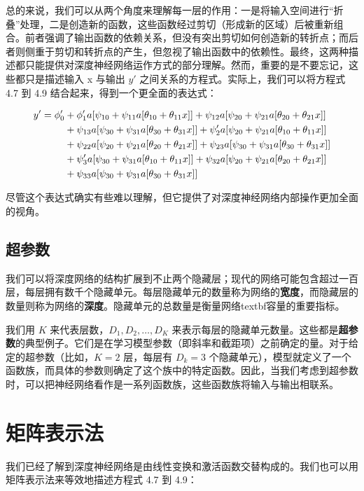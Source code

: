 总的来说，我们可以从两个角度来理解每一层的作用：一是将输入空间进行“折叠”处理，二是创造新的函数，这些函数经过剪切（形成新的区域）后被重新组合。前者强调了输出函数的依赖关系，但没有突出剪切如何创造新的转折点；而后者则侧重于剪切和转折点的产生，但忽视了输出函数中的依赖性。最终，这两种描述都只能提供对深度神经网络运作方式的部分理解。然而，重要的是不要忘记，这些都只是描述输入 x 与输出 \(y \prime\) 之间关系的方程式。实际上，我们可以将方程式 4.7 到 4.9 结合起来，得到一个更全面的表达式：



\begin{align}
	y' = \phi'_0 &+ \phi'_1 a[\psi_{10} + \psi_{11} a[\theta_{10} + \theta_{11} x]] + \psi_{12} a[\psi_{20} + \psi_{21} a[\theta_{20} + \theta_{21} x]] \notag \\
	&+ \psi_{13} a[\psi_{30} + \psi_{31} a[\theta_{30} + \theta_{31} x]] + \psi'_{2} a[\psi_{20} + \psi_{21} a[\theta_{10} + \theta_{11} x]] \notag \\
	&+ \psi_{22} a[\psi_{20} + \psi_{21} a[\theta_{20} + \theta_{21} x]] + \psi_{23} a[\psi_{30} + \psi_{31} a[\theta_{30} + \theta_{31} x]] \notag \\
	&+ \psi'_{3} a[\psi_{30} + \psi_{31} a[\theta_{10} + \theta_{11} x]] + \psi_{32} a[\psi_{20} + \psi_{21} a[\theta_{20} + \theta_{21} x]] \notag \\
	&+ \psi_{33} a[\psi_{30} + \psi_{31} a[\theta_{30} + \theta_{31} x]] 
\end{align} 


尽管这个表达式确实有些难以理解，但它提供了对深度神经网络内部操作更加全面的视角。

\subsection{超参数}
我们可以将深度网络的结构扩展到不止两个隐藏层；现代的网络可能包含超过一百层，每层拥有数千个隐藏单元。每层隐藏单元的数量称为网络的\textbf{宽度}，而隐藏层的数量则称为网络的\textbf{深度}。隐藏单元的总数量是衡量网络textbf{容量}的重要指标。

我们用 \(K\) 来代表层数，\(D_1, D_2, \ldots, D_K\) 来表示每层的隐藏单元数量。这些都是\textbf{超参数}的典型例子。它们是在学习模型参数（即斜率和截距项）之前确定的量。对于给定的超参数（比如，\(K = 2\) 层，每层有 \(D_k = 3\) 个隐藏单元），模型就定义了一个函数族，而具体的参数则确定了这个族中的特定函数。因此，当我们考虑到超参数时，可以把神经网络看作是一系列函数族，这些函数族将输入与输出相联系。


\section{矩阵表示法}
我们已经了解到深度神经网络是由线性变换和激活函数交替构成的。我们也可以用矩阵表示法来等效地描述方程式 4.7 到 4.9：

